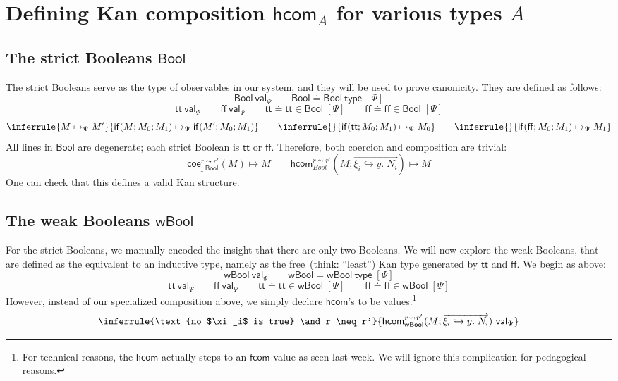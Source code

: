 \documentclass{article} \usepackage{chtt-notes} \usepackage{stmaryrd}
\renewcommand{\bool}{\mathsf{Bool}}
\newcommand{\wbool}{\mathsf{wBool}}
\newcommand{\hcom}{\mathsf{hcom}}
\newcommand{\coe}{\mathsf{coe}}
\newcommand{\ival}[1]{#1~\mathsf{val}}
\newcommand{\itype}[1]{#1~\mathsf{type}}
\newcommand{\di}[1]{\;[#1]}
\newcommand{\ps}{\di{\Psi}}
\newcommand{\T}{\mathsf{tt}}
\newcommand{\F}{\mathsf{ff}}
\newcommand{\If}{\mathsf{if}}
\newcommand{\hcomr}{(M; \overrightarrow{\xi_i \hookrightarrow y. \; N_i})}
\begin{document}
\maketitle

\section{Defining Kan composition $\hcom_A$ for various types $A$}
\subsection{The strict Booleans $\bool$}
The strict Booleans serve as the type of observables in our system, and they will be used to prove canonicity.
They are defined as follows:
\[ \ival{\bool}_{\Psi} \qquad \itype{\bool \doteq \bool} \ps \]
\[ \ival{\T}_{\Psi} \qquad \ival{\F}_{\Psi} \qquad \T \doteq \T \in \bool \ps \qquad \F \doteq \F \in \bool \ps \]
\[ \inferrule{M \mapsto_{\Psi} M'}{\If(M; M_0; M_1) \mapsto_{\Psi} \If(M'; M_0; M_1)} \qquad \inferrule{ }{\If(\T; M_0; M_1) \mapsto_{\Psi} M_0} \qquad \inferrule{ }{\If(\F; M_0; M_1) \mapsto_{\Psi} M_1} \]
All lines in $\bool$ are degenerate; each strict Boolean is $\T$ or $\F$. Therefore, both coercion and composition are trivial:
\[ \coe^{r \leadsto r'}_{\_.\bool}(M) \mapsto M \qquad \hcom^{r \leadsto r'}_{Bool}(M; \overrightarrow{\xi_i \hookrightarrow y. \; N_i}) \mapsto M\]
One can check that this defines a valid Kan structure.

\subsection{The weak Booleans $\wbool$}
For the strict Booleans, we manually encoded the insight that there are only two Booleans.
We will now explore the weak Booleans, that are defined as the equivalent to an inductive type, namely as the free~(think: ``least'') Kan type generated by $\T$ and $\F$.
We begin as above:
\[ \ival{\wbool}_{\Psi} \qquad \itype{\wbool \doteq \wbool} \ps \]
\[ \ival{\T}_{\Psi} \qquad \ival{\F}_{\Psi} \qquad \T \doteq \T \in \wbool \ps \qquad \F \doteq \F \in \wbool \ps \]
However, instead of our specialized composition above, we simply declare $\hcom$'s to be values:\footnote{For technical reasons, the $\hcom$ actually steps to an $\mathsf{fcom}$ value as seen last week. We will ignore this complication for pedagogical reasons.}
\[ \inferrule{\text{no $\xi_i$ is true} \and r \neq r'}{\ival{\hcom^{r \leadsto r'}_{\wbool}\hcomr}_{\Psi}} \]
\end{document}
